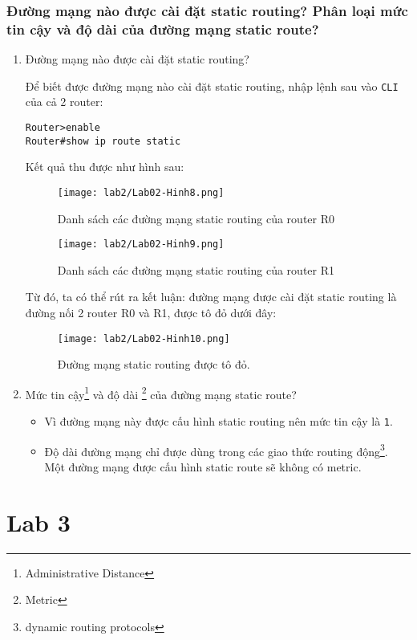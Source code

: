 \documentclass[]{article}
\begin{document}
\subsubsection{Đường mạng nào được cài đặt static routing? Phân loại mức tin cậy và độ dài của đường mạng static route?}
\begin{enumerate}
\item Đường mạng nào được cài đặt static routing?

Để biết được đường mạng nào cài đặt static routing, nhập lệnh sau vào \texttt{CLI} của cả 2 router:
\begin{lstlisting}
Router>enable
Router#show ip route static
\end{lstlisting}
Kết quả thu được như hình sau:
\begin{figure}[H]
    \centering
    \texttt{[image: lab2/Lab02-Hinh8.png]}
    \caption{Danh sách các đường mạng static routing của router R0}
\end{figure}
\begin{figure}[H]
    \centering
    \texttt{[image: lab2/Lab02-Hinh9.png]}
    \caption{Danh sách các đường mạng static routing của router R1}
\end{figure}
Từ đó, ta có thể rút ra kết luận: đường mạng được cài đặt static routing là đường nối 2 router R0 và R1, được tô đỏ dưới đây:
\begin{figure}[H]
    \centering
    \texttt{[image: lab2/Lab02-Hinh10.png]}
    \caption{Đường mạng static routing được tô đỏ.}
\end{figure}
\item Mức tin cậy\footnote{Administrative Distance} và độ dài \footnote{Metric} của đường mạng static route?
\begin{itemize}
\item Vì đường mạng này được cấu hình static routing nên mức tin cậy là \texttt{1}\cite{cisco:ad}.
\item Độ dài đường mạng chỉ được dùng trong các giao thức routing động\footnote{dynamic routing protocols}. Một đường mạng được cấu hình static route sẽ không có metric.\cite{cisco:metric}
\end{itemize}
\end{enumerate}
\section{Lab 3}
\end{document}
